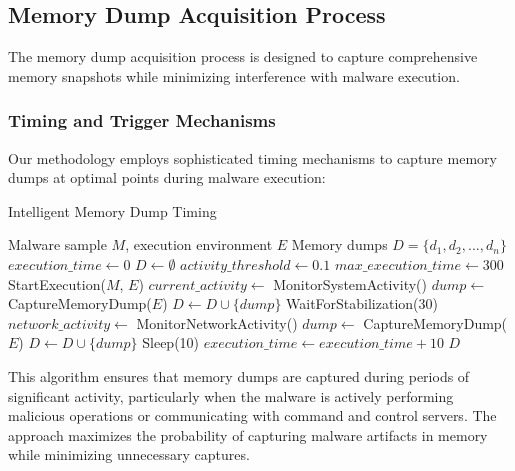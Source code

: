 \subsection{Memory Dump Acquisition Process}
\label{subsec:dump-acquisition}

The memory dump acquisition process is designed to capture comprehensive memory snapshots while minimizing interference with malware execution.

\subsubsection{Timing and Trigger Mechanisms}

Our methodology employs sophisticated timing mechanisms to capture memory dumps at optimal points during malware execution:

\begin{algorithm}[!htbp]
\caption{Intelligent Memory Dump Timing}
\label{alg:dump-timing}
\begin{algorithmic}[1]
\Require Malware sample $M$, execution environment $E$
\Ensure Memory dumps $D = \{d_1, d_2, ..., d_n\}$
\State $execution\_time \leftarrow 0$
\State $D \leftarrow \emptyset$
\State $activity\_threshold \leftarrow 0.1$
\State $max\_execution\_time \leftarrow 300$ 
\State StartExecution($M$, $E$)
    \State $current\_activity \leftarrow$ MonitorSystemActivity()
        \State $dump \leftarrow$ CaptureMemoryDump($E$)
        \State $D \leftarrow D \cup \{dump\}$
        \State WaitForStabilization(30) 
    \EndIf
    \State $network\_activity \leftarrow$ MonitorNetworkActivity()
        \State $dump \leftarrow$ CaptureMemoryDump($E$)
        \State $D \leftarrow D \cup \{dump\}$
    \EndIf
    \State Sleep(10) 
    \State $execution\_time \leftarrow execution\_time + 10$
\EndWhile
\Return $D$
\end{algorithmic}
\end{algorithm}

This algorithm ensures that memory dumps are captured during periods of significant activity, particularly when the malware is actively performing malicious operations or communicating with command and control servers. The approach maximizes the probability of capturing malware artifacts in memory while minimizing unnecessary captures.

